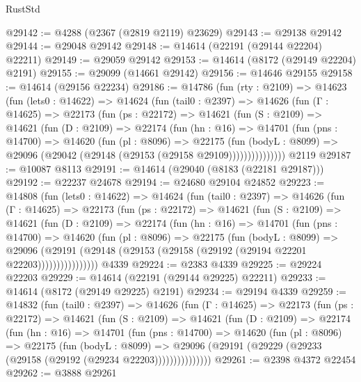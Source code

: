 \begin{lexlean}{RustStd}
\begin{coremodule}
@29142 := @4288 (@2367 (@2819 @2119) @23629)
@29143 := @29138 @29142
@29144 := @29048 @29142
@29148 := @14614 (@22191 (@29144 @22204) @22211)
@29149 := @29059 @29142
@29153 := @14614 (@8172 (@29149 @22204) @2191)
@29155 := @29099 (@14661 @29142)
@29156 := @14646 @29155
@29158 := @14614 (@29156 @22234)
@29186 := @14786
    (fun (rty : @2109) =>
    @14623
      (fun (lets0 : @14622) =>
      @14624
        (fun (tail0 : @2397) =>
        @14626
          (fun (Γ : @14625) =>
          @22173
            (fun (ps : @22172) =>
            @14621
              (fun (S : @2109) =>
              @14621
                (fun (D : @2109) =>
                @22174
                  (fun (hn : @16) =>
                  @14701
                    (fun (pns : @14700) =>
                    @14620
                      (fun (pl : @8096) =>
                      @22175
                        (fun (bodyL : @8099) =>
                        @29096 (@29042 (@29148 (@29153 (@29158 @29109)))))))))))))))
    @2119
@29187 := @10087 @8113
@29191 := @14614 (@29040 (@8183 (@22181 @29187)))
@29192 := @22237 @24678
@29194 := @24680 @29104 @24852
@29223 := @14808
    (fun (lets0 : @14622) =>
    @14624
      (fun (tail0 : @2397) =>
      @14626
        (fun (Γ : @14625) =>
        @22173
          (fun (ps : @22172) =>
          @14621
            (fun (S : @2109) =>
            @14621
              (fun (D : @2109) =>
              @22174
                (fun (hn : @16) =>
                @14701
                  (fun (pns : @14700) =>
                  @14620
                    (fun (pl : @8096) =>
                    @22175
                      (fun (bodyL : @8099) =>
                      @29096
                        (@29191
                          (@29148 (@29153 (@29158 (@29192 (@29194 @22201 @22203))))))))))))))))
    @4339
@29224 := @2383 @4339
@29225 := @29224 @22203
@29229 := @14614 (@22191 (@29144 @29225) @22211)
@29233 := @14614 (@8172 (@29149 @29225) @2191)
@29234 := @29194 @4339
@29259 := @14832
    (fun (tail0 : @2397) =>
    @14626
      (fun (Γ : @14625) =>
      @22173
        (fun (ps : @22172) =>
        @14621
          (fun (S : @2109) =>
          @14621
            (fun (D : @2109) =>
            @22174
              (fun (hn : @16) =>
              @14701
                (fun (pns : @14700) =>
                @14620
                  (fun (pl : @8096) =>
                  @22175
                    (fun (bodyL : @8099) =>
                    @29096 (@29191 (@29229 (@29233 (@29158 (@29192 (@29234 @22203)))))))))))))))
@29261 := @2398 @4372 @22454
@29262 := @3888 @29261

\end{coremodule}
\end{lexlean}
